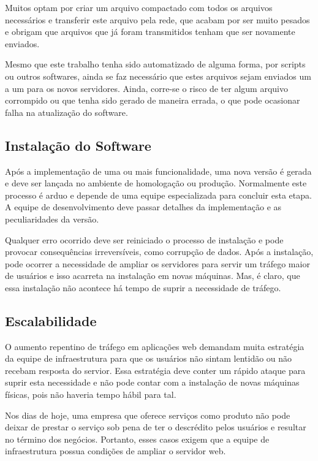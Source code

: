 \documentclass[
	12pt,				%
	openright,			%
	oneside,			%
	a4paper,			%
	chapter=TITLE,		%
	section=TITLE,		%
	english,			%
	french,				%
	spanish,			%
	brazil				%
	]{abntex2}
\begin{document}
Muitos optam por criar um arquivo compactado com todos os arquivos necessários e transferir este arquivo pela rede, que acabam por ser muito pesados e obrigam que arquivos que já foram transmitidos tenham que ser novamente enviados.

Mesmo que este trabalho tenha sido automatizado de alguma forma, por scripts ou outros softwares, ainda se faz necessário que estes arquivos sejam enviados um a um para os novos servidores. Ainda, corre-se o risco de ter algum arquivo corrompido ou que tenha sido gerado de maneira errada, o que pode ocasionar falha na atualização do software.

\subsection{Instalação do Software}

Após a implementação de uma ou mais funcionalidade, uma nova versão é gerada e deve ser lançada no ambiente de homologação ou produção. Normalmente este processo é arduo e depende de uma equipe especializada para concluir esta etapa. A equipe de desenvolvimento deve passar detalhes da implementação e as peculiaridades da versão.

Qualquer erro ocorrido deve ser reiniciado o processo de instalação e pode provocar consequências irreversíveis, como corrupção de dados. Após a instalação, pode ocorrer a necessidade de ampliar os servidores para servir um tráfego maior de usuários e isso acarreta na instalação em novas máquinas. Mas, é claro, que essa instalação não acontece há tempo de suprir a necessidade de tráfego.

\subsection{Escalabilidade}

O aumento repentino de tráfego em aplicações web demandam muita estratégia da equipe de infraestrutura para que os usuários não sintam lentidão ou não recebam resposta do servior. Essa estratégia deve conter um rápido ataque para suprir esta necessidade e não pode contar com a instalação de novas máquinas físicas, pois não haveria tempo hábil para tal.

Nos dias de hoje, uma empresa que oferece serviços como produto não pode deixar de prestar o serviço sob pena de ter o descrédito pelos usuários e resultar no término dos negócios. Portanto, esses casos exigem que a equipe de infraestrutura possua condições de ampliar o servidor web.
\end{document}
